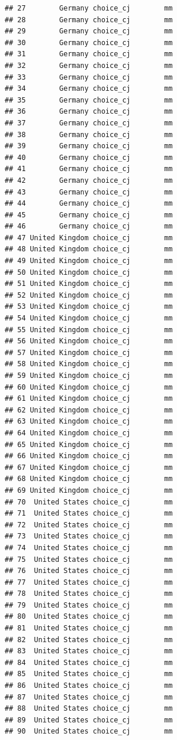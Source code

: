 \documentclass[a4paper,12pt]{article}\usepackage[]{graphicx}\usepackage[]{color}
\makeatletter
\newenvironment{kframe}{%
 \def\at@end@of@kframe{}%
 \ifinner\ifhmode%
  \def\at@end@of@kframe{\end{minipage}}%
  \begin{minipage}{\columnwidth}%
 \fi\fi%
 \def\FrameCommand##1{\hskip\@totalleftmargin \hskip-\fboxsep
 \colorbox{shadecolor}{##1}\hskip-\fboxsep
     \hskip-\linewidth \hskip-\@totalleftmargin \hskip\columnwidth}%
 \MakeFramed {\advance\hsize-\width
   \@totalleftmargin\z@ \linewidth\hsize
   \@setminipage}}%
 {\par\unskip\endMakeFramed%
 \at@end@of@kframe}
\newenvironment{knitrout}{}{} %
\makeatother
\begin{document}
\begin{knitrout}
\begin{kframe}
\begin{verbatim}
## 27        Germany choice_cj        mm
## 28        Germany choice_cj        mm
## 29        Germany choice_cj        mm
## 30        Germany choice_cj        mm
## 31        Germany choice_cj        mm
## 32        Germany choice_cj        mm
## 33        Germany choice_cj        mm
## 34        Germany choice_cj        mm
## 35        Germany choice_cj        mm
## 36        Germany choice_cj        mm
## 37        Germany choice_cj        mm
## 38        Germany choice_cj        mm
## 39        Germany choice_cj        mm
## 40        Germany choice_cj        mm
## 41        Germany choice_cj        mm
## 42        Germany choice_cj        mm
## 43        Germany choice_cj        mm
## 44        Germany choice_cj        mm
## 45        Germany choice_cj        mm
## 46        Germany choice_cj        mm
## 47 United Kingdom choice_cj        mm
## 48 United Kingdom choice_cj        mm
## 49 United Kingdom choice_cj        mm
## 50 United Kingdom choice_cj        mm
## 51 United Kingdom choice_cj        mm
## 52 United Kingdom choice_cj        mm
## 53 United Kingdom choice_cj        mm
## 54 United Kingdom choice_cj        mm
## 55 United Kingdom choice_cj        mm
## 56 United Kingdom choice_cj        mm
## 57 United Kingdom choice_cj        mm
## 58 United Kingdom choice_cj        mm
## 59 United Kingdom choice_cj        mm
## 60 United Kingdom choice_cj        mm
## 61 United Kingdom choice_cj        mm
## 62 United Kingdom choice_cj        mm
## 63 United Kingdom choice_cj        mm
## 64 United Kingdom choice_cj        mm
## 65 United Kingdom choice_cj        mm
## 66 United Kingdom choice_cj        mm
## 67 United Kingdom choice_cj        mm
## 68 United Kingdom choice_cj        mm
## 69 United Kingdom choice_cj        mm
## 70  United States choice_cj        mm
## 71  United States choice_cj        mm
## 72  United States choice_cj        mm
## 73  United States choice_cj        mm
## 74  United States choice_cj        mm
## 75  United States choice_cj        mm
## 76  United States choice_cj        mm
## 77  United States choice_cj        mm
## 78  United States choice_cj        mm
## 79  United States choice_cj        mm
## 80  United States choice_cj        mm
## 81  United States choice_cj        mm
## 82  United States choice_cj        mm
## 83  United States choice_cj        mm
## 84  United States choice_cj        mm
## 85  United States choice_cj        mm
## 86  United States choice_cj        mm
## 87  United States choice_cj        mm
## 88  United States choice_cj        mm
## 89  United States choice_cj        mm
## 90  United States choice_cj        mm

\end{verbatim}
\end{kframe}
\end{knitrout}
\end{document}
